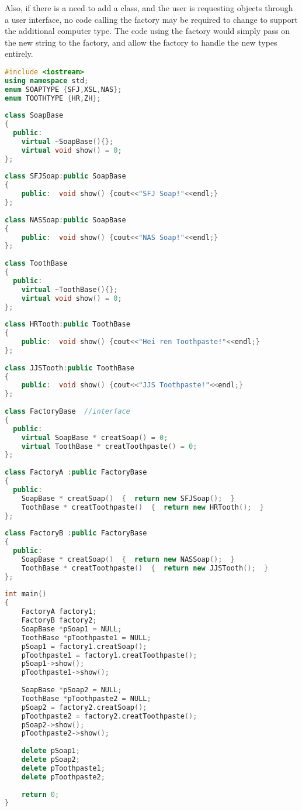 \documentclass{book}
\begin{document}
Also, if there is a need to add a class, and the user is requesting objects through a user interface, no code calling the factory may be required to change to support the additional computer type.
The code using the factory would simply pass on the new string to the factory, and allow the factory to handle the new types entirely.

\begin{lstlisting}[caption={Abstract Factory Pattern sample 1}, language=C++]
#include <iostream>  
using namespace std;  
enum SOAPTYPE {SFJ,XSL,NAS};  
enum TOOTHTYPE {HR,ZH};  
  
class SoapBase  
{  
  public:  
    virtual ~SoapBase(){};  
    virtual void show() = 0;  
};  
  
class SFJSoap:public SoapBase  
{  
    public:  void show() {cout<<"SFJ Soap!"<<endl;}  
};  
  
class NASSoap:public SoapBase  
{  
    public:  void show() {cout<<"NAS Soap!"<<endl;}  
};  
  
class ToothBase  
{  
  public:  
    virtual ~ToothBase(){};  
    virtual void show() = 0;  
};  
  
class HRTooth:public ToothBase  
{  
    public:  void show() {cout<<"Hei ren Toothpaste!"<<endl;}  
};  
  
class JJSTooth:public ToothBase  
{  
    public:  void show() {cout<<"JJS Toothpaste!"<<endl;}  
};  
  
class FactoryBase  //interface
{  
  public:  
    virtual SoapBase * creatSoap() = 0;  
    virtual ToothBase * creatToothpaste() = 0;  
};  
  
class FactoryA :public FactoryBase  
{  
  public:  
    SoapBase * creatSoap()  {  return new SFJSoap();  }  
    ToothBase * creatToothpaste()  {  return new HRTooth();  }  
};  
  
class FactoryB :public FactoryBase  
{  
  public:  
    SoapBase * creatSoap()  {  return new NASSoap();  }  
    ToothBase * creatToothpaste()  {  return new JJSTooth();  }  
};  
  
int main()  
{  
    FactoryA factory1;  
    FactoryB factory2;  
    SoapBase *pSoap1 = NULL;  
    ToothBase *pToothpaste1 = NULL;  
    pSoap1 = factory1.creatSoap();  
    pToothpaste1 = factory1.creatToothpaste();  
    pSoap1->show();  
    pToothpaste1->show();  
      
    SoapBase *pSoap2 = NULL;  
    ToothBase *pToothpaste2 = NULL;  
    pSoap2 = factory2.creatSoap();  
    pToothpaste2 = factory2.creatToothpaste();  
    pSoap2->show();  
    pToothpaste2->show();  
      
    delete pSoap1;  
    delete pSoap2;  
    delete pToothpaste1;  
    delete pToothpaste2;  
      
    return 0;  
}  
\end{lstlisting}
\end{document}
